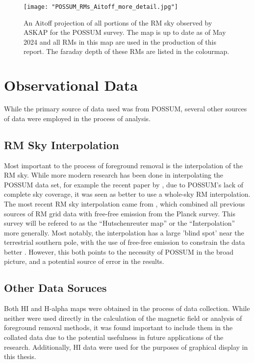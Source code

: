 \begin{figure}
    \texttt{[image: "POSSUM\_RMs\_Aitoff\_more\_detail.jpg"]}
    \centering
    \caption{An Aitoff projection of all portions of the RM sky observed by ASKAP for the POSSUM survey. The map is up to date as of May 2024 and all RMs in this map are used in the production of this report. The faraday depth of these RMs are listed in the colourmap.}
    \label{fig:rm_map}
\end{figure}

\section{Observational Data}
\label{sec:data}

While the primary source of data used was from POSSUM, several other sources of data were employed in the process of analysis.

\subsection{RM Sky Interpolation}
\label{ssec:legacy}

Most important to the process of foreground removal is the interpolation of the RM sky. While more modern research has been done in interpolating the POSSUM data set, for example the recent paper by \cite{ID58}, due to POSSUM's lack of complete sky coverage, it was seen as better to use a whole-sky RM interpolation. The most recent RM sky interpolation came from \cite{ID44, ID45}, which combined all previous sources of RM grid data with free-free emission from the Planck survey. This survey will be refered to as the “Hutschenreuter map” or the “Interpolation” more generally. Most notably, the interpolation has a large 'blind spot' near the terrestrial southern pole, with the use of free-free emission to constrain the data better \citep{ID44, ID45}. However, this both points to the necessity of POSSUM in the broad picture, and a potential source of error in the results.

\subsection{Other Data Soruces}
\label{ssec:other_data}

Both HI and H-alpha maps were obtained in the process of data collection. While neither were used directly in the calculation of the magnetic field or analysis of foreground removal methods, it was found important to include them in the collated data due to the potential usefulness in future applications of the research. Additionally, HI data were used for the purposes of graphical display in this thesis.


